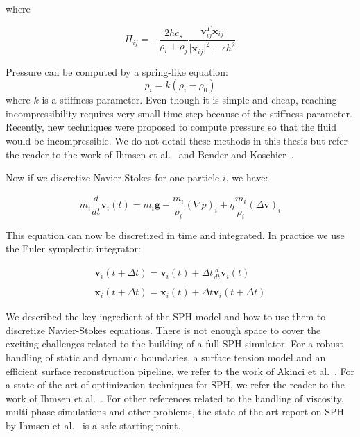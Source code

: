 where 

\begin{equation}
    \Pi_{ij} = -\frac{2hc_{s}}{\rho_{i}+\rho_{j}}\frac{\mathbf{v}_{ij}^{T}\mathbf{x}_{ij}}{\vert \mathbf{x}_{ij} \vert^{2} + \epsilon h^{2}}
\end{equation}

Pressure can be computed by a spring-like equation:
\begin{equation}
\label{eq:pressureSPH}
p_{i} = k\left(\rho_{i}-\rho_{0}\right)
\end{equation}
where $k$ is a stiffness parameter. Even though it is simple and cheap, reaching incompressibility requires very small time step because of the stiffness parameter. Recently, new techniques were proposed to compute pressure so that the fluid would be incompressible. We do not detail these methods in this thesis but refer the reader to the work of Ihmsen et al.~\cite{Ihmsen2014:IISPH} and Bender and Koschier~\cite{Bender2015}.

Now if we discretize Navier-Stokes for one particle $i$, we have:

\begin{equation}
    \displaystyle m_{i}\frac{d}{dt}\mathbf{v}_{i}(t) = m_{i}\mathbf{g} - \frac{m_{i}}{\rho_{i}}(\nabla p)_{i} + \eta\frac{m_{i}}{\rho_{i}}\left(\Delta \mathbf{v}\right)_{i}
\end{equation}

This equation can now be discretized in time and integrated. In practice we use the Euler symplectic integrator:

\begin{equation}
\begin{array}{ll}
\displaystyle \mathbf{v}_{i}(t+\Delta t) = \mathbf{v}_{i}(t) + \Delta t \frac{d}{dt}\mathbf{v}_{i}(t) \\ \\
\displaystyle \mathbf{x}_{i}(t+\Delta t) = \mathbf{x}_{i}(t) + \Delta t \mathbf{v}_{i}(t+\Delta t)
\end{array}
\end{equation}

We described the key ingredient of the SPH model and how to use them to discretize Navier-Stokes equations. There is not enough space to cover the exciting challenges related to the building of a full SPH simulator. For a robust handling of static and dynamic boundaries, a surface tension model and an efficient surface reconstruction pipeline, we refer to the work of Akinci et al.~\cite{Akinci2012b, Akinci2013, Akinci2012a}.  For a state of the art of optimization techniques for SPH, we refer the reader to the work of Ihmsen et al.~\cite{Ihmsen2011:ParallelSPH}. For other references related to the handling of viscosity, multi-phase simulations and other problems, the state of the art report on SPH by Ihmsen et al.~\cite{Ihmsen2014:STAR} is a safe starting point.

